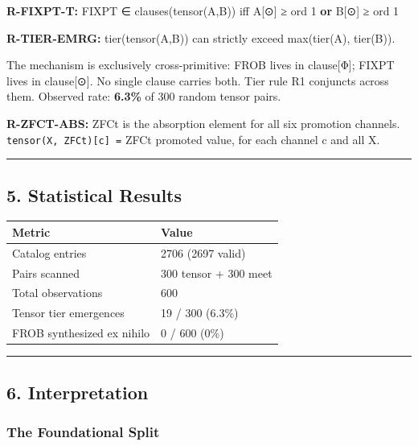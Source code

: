 \textbf{R-FIXPT-T:} FIXPT ∈ clauses(tensor(A,B)) iff A{[}⊙{]} ≥ ord 1
\textbf{or} B{[}⊙{]} ≥ ord 1

\textbf{R-TIER-EMRG:} tier(tensor(A,B)) can strictly exceed max(tier(A),
tier(B)).

The mechanism is exclusively cross-primitive: FROB lives in
clause{[}Φ{]}; FIXPT lives in clause{[}⊙{]}. No single clause carries
both. Tier rule R1 conjuncts across them. Observed rate: \textbf{6.3\%}
of 300 random tensor pairs.

\textbf{R-ZFCT-ABS:} ZFCt is the absorption element for all six
promotion channels. \texttt{tensor(X,\ ZFCt){[}c{]}\ =} ZFCt promoted
value, for each channel c and all X.

\begin{center}\rule{0.5\linewidth}{0.5pt}\end{center}

\subsection{5. Statistical Results}\label{statistical-results}

{\def\LTcaptype{none} %
\begin{longtable}[]{@{}ll@{}}
\toprule\noalign{}
Metric & Value \\
\midrule\noalign{}
\endhead
\bottomrule\noalign{}
\endlastfoot
Catalog entries & 2706 (2697 valid) \\
Pairs scanned & 300 tensor + 300 meet \\
Total observations & 600 \\
Tensor tier emergences & 19 / 300 (6.3\%) \\
FROB synthesized ex nihilo & 0 / 600 (0\%) \\
\end{longtable}
}

\begin{center}\rule{0.5\linewidth}{0.5pt}\end{center}

\subsection{6. Interpretation}\label{interpretation}

\subsubsection{The Foundational Split}\label{the-foundational-split}

